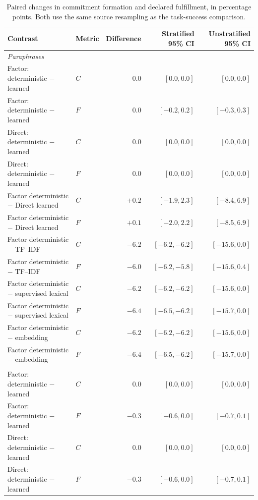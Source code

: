 \documentclass[sigconf,nonacm,balance=false]{aamas}
\newcommand{\tabstyle}{\small\setlength{\tabcolsep}{3pt}\renewcommand{\arraystretch}{1.10}}
\begin{document}
\begin{table}[!htbp]
\centering\tabstyle
\caption{Paired changes in commitment formation and declared fulfillment, in percentage points. Both use the same source resampling as the task-success comparison.}
\label{tab:online-cf-effects}
\begin{tabular}{@{}llrrr@{}}
\toprule
Contrast & Metric & Difference & Stratified 95\% CI & Unstratified 95\% CI\\\midrule
\multicolumn{5}{l}{\textit{Paraphrases}}\\
Factor: deterministic $-$ learned & $C$ & $0.0$ & $[0.0,0.0]$ & $[0.0,0.0]$\\
Factor: deterministic $-$ learned & $F$ & $0.0$ & $[-0.2,0.2]$ & $[-0.3,0.3]$\\
Direct: deterministic $-$ learned & $C$ & $0.0$ & $[0.0,0.0]$ & $[0.0,0.0]$\\
Direct: deterministic $-$ learned & $F$ & $0.0$ & $[0.0,0.0]$ & $[0.0,0.0]$\\
Factor deterministic $-$ Direct learned & $C$ & $+0.2$ & $[-1.9,2.3]$ & $[-8.4,6.9]$\\
Factor deterministic $-$ Direct learned & $F$ & $+0.1$ & $[-2.0,2.2]$ & $[-8.5,6.9]$\\
Factor deterministic $-$ TF--IDF & $C$ & $-6.2$ & $[-6.2,-6.2]$ & $[-15.6,0.0]$\\
Factor deterministic $-$ TF--IDF & $F$ & $-6.0$ & $[-6.2,-5.8]$ & $[-15.6,0.4]$\\
Factor deterministic $-$ supervised lexical & $C$ & $-6.2$ & $[-6.2,-6.2]$ & $[-15.6,0.0]$\\
Factor deterministic $-$ supervised lexical & $F$ & $-6.4$ & $[-6.5,-6.2]$ & $[-15.7,0.0]$\\
Factor deterministic $-$ embedding & $C$ & $-6.2$ & $[-6.2,-6.2]$ & $[-15.6,0.0]$\\
Factor deterministic $-$ embedding & $F$ & $-6.4$ & $[-6.5,-6.2]$ & $[-15.7,0.0]$\\
\addlinespace
\multicolumn{5}{l}{\textit{With distractors}}\\
Factor: deterministic $-$ learned & $C$ & $0.0$ & $[0.0,0.0]$ & $[0.0,0.0]$\\
Factor: deterministic $-$ learned & $F$ & $-0.3$ & $[-0.6,0.0]$ & $[-0.7,0.1]$\\
Direct: deterministic $-$ learned & $C$ & $0.0$ & $[0.0,0.0]$ & $[0.0,0.0]$\\
Direct: deterministic $-$ learned & $F$ & $-0.3$ & $[-0.6,0.0]$ & $[-0.7,0.1]$\\

\end{tabular}
\end{table}
\end{document}
